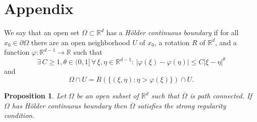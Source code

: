 \documentclass[10pt,leqno]{amsart}
\newtheorem{prop}{Proposition}%
\theoremstyle{definition}
\newcommand{\R}{\mathbb R}
\let\phi\varphi
\begin{document}
\section{Appendix}

We say that an open set $\Omega\subset\R^d$ has a \emph{H\"older continuous boundary} if for all $x_0\in\partial\Omega$ there are an open neighborhood $U$ of $x_0$, a rotation $R$ of $\R^d$, and a function $\phi\colon\R^{d-1}\to\R$ such that
\begin{equation}\label{eq:Hoelder continuity}
	\exists\, C\geq 1, \theta\in (0,1]\,\forall\, \xi,\eta\in\R^{d-1}\colon\,|\varphi(\xi)-\varphi(\eta)|\leq C|\xi-\eta|^\theta
\end{equation}
and
$$\Omega\cap U=R(\{(\xi,\eta)\colon \eta>\phi(\xi)\})\cap U.$$

\begin{prop}\label{prop:Hoelder boundary implies strong regularity}
Let $\Omega$ be an open subset of $\R^d$ such that $\overline{\Omega}$ is path connected. If $\Omega$ has H\"older continuous boundary then $\overline{\Omega}$ satisfies the strong regularity condition.
\end{prop}
\end{document}
